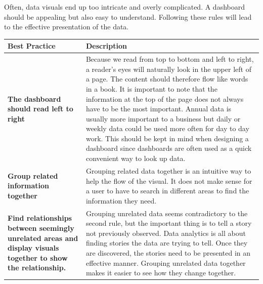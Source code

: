\documentclass[]{book}
\begin{document}
Often, data visuals end up too intricate and overly complicated. A dashboard should be appealing but also easy to understand. Following these rules will lead to the effective presentation of the data.

\begin{longtable}[]{@{}ll@{}}
\toprule
\begin{minipage}[b]{0.17\columnwidth}\raggedright
Best Practice\strut
\end{minipage} & \begin{minipage}[b]{0.77\columnwidth}\raggedright
Description\strut
\end{minipage}\tabularnewline
\midrule
\endhead
\begin{minipage}[t]{0.17\columnwidth}\raggedright
\textbf{The dashboard should read left to right}\strut
\end{minipage} & \begin{minipage}[t]{0.77\columnwidth}\raggedright
Because we read from top to bottom and left to right, a reader's eyes will naturally look in the upper left of a page. The content should therefore flow like words in a book. It is important to note that the information at the top of the page does not always have to be the most important. Annual data is usually more important to a business but daily or weekly data could be used more often for day to day work. This should be kept in mind when designing a dashboard since dashboards are often used as a quick convenient way to look up data.\strut
\end{minipage}\tabularnewline
\begin{minipage}[t]{0.17\columnwidth}\raggedright
\textbf{Group related information together}\strut
\end{minipage} & \begin{minipage}[t]{0.77\columnwidth}\raggedright
Grouping related data together is an intuitive way to help the flow of the visual. It does not make sense for a user to have to search in different areas to find the information they need.\strut
\end{minipage}\tabularnewline
\begin{minipage}[t]{0.17\columnwidth}\raggedright
\textbf{Find relationships between seemingly unrelated areas and display visuals together to show the relationship.}\strut
\end{minipage} & \begin{minipage}[t]{0.77\columnwidth}\raggedright
Grouping unrelated data seems contradictory to the second rule, but the important thing is to tell a story not previously observed. Data analytics is all about finding stories the data are trying to tell. Once they are discovered, the stories need to be presented in an effective manner. Grouping unrelated data together makes it easier to see how they change together.\strut

\end{minipage}
\end{longtable}
\end{document}
